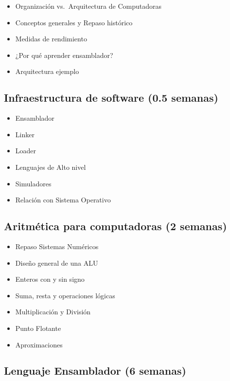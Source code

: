 \documentclass[11pt,fleqn]{report}
\providecommand{\tightlist}{%
	  \setlength{\itemsep}{0pt}\setlength{\parskip}{0pt}}
\begin{document}
\begin{itemize}
\tightlist
\item
  Organización vs.~Arquitectura de Computadoras
\item
  Conceptos generales y Repaso histórico
\item
  Medidas de rendimiento
\item
  ¿Por qué aprender ensamblador?
\item
  Arquitectura ejemplo
\end{itemize}

\subsection{Infraestructura de software (0.5
semanas)}\label{infraestructura-de-software-0.5-semanas}

\begin{itemize}
\tightlist
\item
  Ensamblador
\item
  Linker
\item
  Loader
\item
  Lenguajes de Alto nivel
\item
  Simuladores
\item
  Relación con Sistema Operativo
\end{itemize}

\subsection{Aritmética para computadoras (2
semanas)}\label{aritmuxe9tica-para-computadoras-2-semanas}

\begin{itemize}
\tightlist
\item
  Repaso Sistemas Numéricos
\item
  Diseño general de una ALU
\item
  Enteros con y sin signo
\item
  Suma, resta y operaciones lógicas
\item
  Multiplicación y División
\item
  Punto Flotante
\item
  Aproximaciones
\end{itemize}

\subsection{Lenguaje Ensamblador (6
semanas)}\label{lenguaje-ensamblador-6-semanas}
\end{document}
